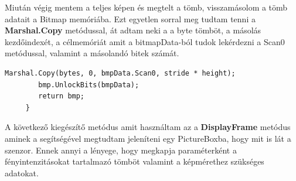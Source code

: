 \documentclass[]{thesis-ekf}
\theoremstyle{definition}
\theoremstyle{remark}
\begin{document}
Miután végig mentem a teljes képen és megtelt a tömb, visszamásolom a tömb adatait a Bitmap memóriába. Ezt egyetlen sorral meg tudtam tenni a \textbf{Marshal.Copy}\cite{marshal.copy} metódussal, át adtam neki a a byte tömböt, a másolás kezdőindexét, a célmemóriát amit a bitmapData-ból tudok lekérdezni a Scan0 metódussal, valamint a másolandó bitek számát.
\begin{lstlisting}[language=CSharp]	
	 	Marshal.Copy(bytes, 0, bmpData.Scan0, stride * height);
	 	bmp.UnlockBits(bmpData);
	 	return bmp;
	 }
\end{lstlisting}
A következő kiegészítő metódus amit használtam az a \textbf{DisplayFrame} metódus aminek a segítségével megtudtam jeleníteni egy PictureBoxba, hogy mit is lát a szenzor. Ennek annyi a lényege, hogy megkapja paraméterként a fényintenzitásokat tartalmazó tömböt valamint a képmérethez szükséges adatokat. 
\end{document}
